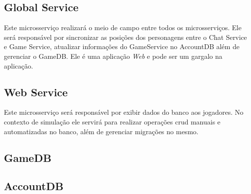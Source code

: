 \subsection{Global Service}

Este microsserviço realizará o meio de campo entre todos os microsserviços.
%
Ele será responsável por sincronizar as posições dos personagens entre o Chat Service e Game Service, atualizar informações do GameService no AccountDB além de gerenciar o GameDB.
%
Ele é uma aplicação \textit{Web} e pode ser um gargalo na aplicação.

\subsection{Web Service}

Este microsserviço será responsável por exibir dados do banco aos jogadores.
%
No contexto de simulação ele servirá para realizar operações \ac{crud} manuais e automatizadas no banco, além de gerenciar migrações no mesmo.

\subsection{GameDB}

\subsection{AccountDB}
